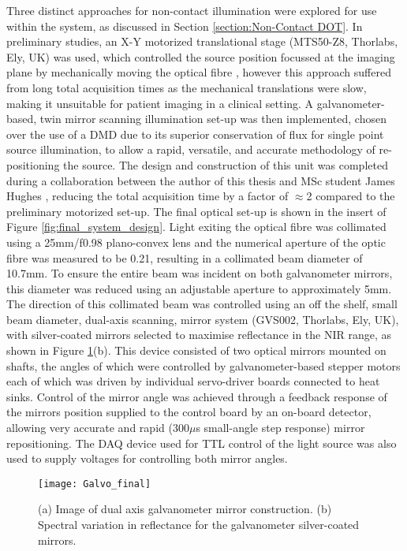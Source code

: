 \documentclass[twoside]{bhamthesis}
\theoremstyle{definition}
\begin{document}
Three distinct approaches for non-contact illumination were explored for use within the system, as discussed in Section \ref{section:Non-Contact DOT}. In preliminary studies, an X-Y motorized translational stage (MTS50-Z8, Thorlabs, Ely, UK) was used, which controlled the source position focussed at the imaging plane by mechanically moving the optical fibre \cite{lighter2016assessing}, however this approach suffered from long total acquisition times as the mechanical translations were slow, making it unsuitable for patient imaging in a clinical setting. A galvanometer-based, twin mirror scanning illumination set-up was then implemented, chosen over the use of a DMD due to its superior conservation of flux for single point source illumination, to allow a rapid, versatile, and accurate methodology of re-positioning the source. The design and construction of this unit was completed during a collaboration between the author of this thesis and MSc student James Hughes \cite{lighter2018multispectral}, reducing the total acquisition time by a factor of $\approx$2 compared to the preliminary motorized set-up. The final optical set-up is shown in the insert of Figure \ref{fig:final_system_design}. Light exiting the optical fibre was collimated using a 25mm/f0.98 plano-convex lens and the numerical aperture of the optic fibre was measured to be 0.21, resulting in a collimated beam diameter of 10.7mm. To ensure the entire beam was incident on both galvanometer mirrors, this diameter was reduced using an adjustable aperture to approximately 5mm. The direction of this collimated beam was controlled using an off the shelf, small beam diameter, dual-axis scanning, mirror system (GVS002, Thorlabs, Ely, UK), with silver-coated mirrors selected to maximise reflectance in the NIR range, as shown in Figure \ref{galvo}(b). This device consisted of two optical mirrors mounted on shafts, the angles of which were controlled by galvanometer-based stepper motors each of which was driven by individual servo-driver boards connected to heat sinks. Control of the mirror angle was achieved through a feedback response of the mirrors position supplied to the control board by an on-board detector, allowing very accurate and rapid (300$\mu$s small-angle step response) mirror repositioning. The DAQ device used for TTL control of the light source was also used to supply voltages for controlling both mirror angles.

\begin{figure}[!ht]
  \centering
  \texttt{[image: Galvo\_final]}
\caption{(a) Image of dual axis galvanometer mirror construction. (b) Spectral variation in reflectance for the galvanometer silver-coated mirrors.}
\label{galvo}
\end{figure}
\end{document}

